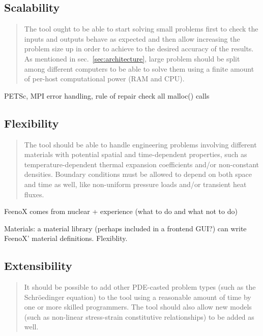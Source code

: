 \documentclass[
  american,
]{article}
\begin{document}
\hypertarget{sec:scalability}{%
\subsection{Scalability}\label{sec:scalability}}

\begin{quote}
The tool ought to be able to start solving small problems first to check
the inputs and outputs behave as expected and then allow increasing the
problem size up in order to achieve to the desired accuracy of the
results. As mentioned in sec.~\ref{sec:architecture}, large problem
should be split among different computers to be able to solve them using
a finite amount of per-host computational power (RAM and CPU).
\end{quote}

PETSc, MPI error handling, rule of repair check all malloc() calls

\hypertarget{flexibility}{%
\subsection{Flexibility}\label{flexibility}}

\begin{quote}
The tool should be able to handle engineering problems involving
different materials with potential spatial and time-dependent
properties, such as temperature-dependent thermal expansion coefficients
and/or non-constant densities. Boundary conditions must be allowed to
depend on both space and time as well, like non-uniform pressure loads
and/or transient heat fluxes.
\end{quote}

FeenoX comes from nuclear + experience (what to do and what not to do)

Materials: a material library (perhaps included in a frontend GUI?) can
write FeenoX' material definitions. Flexiblity.

\hypertarget{sec:extensibility}{%
\subsection{Extensibility}\label{sec:extensibility}}

\begin{quote}
It should be possible to add other PDE-casted problem types (such as the
Schröedinger equation) to the tool using a reasonable amount of time by
one or more skilled programmers. The tool should also allow new models
(such as non-linear stress-strain constitutive relationships) to be
added as well.
\end{quote}
\end{document}
